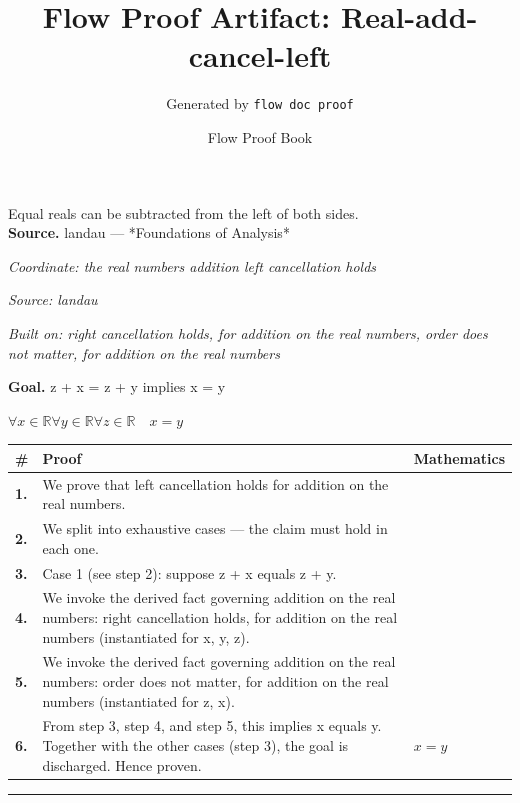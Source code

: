 \documentclass[11pt]{article}
\title{Flow Proof Artifact: Real-add-cancel-left}
\author{Generated by \texttt{flow doc proof}}
\date{Flow Proof Book}
\theoremstyle{definition}
\begin{document}
\maketitle
Equal reals can be subtracted from the left of both sides.\\[0.5em]
\textbf{Source.} landau — *Foundations of Analysis*\\[0.5em]
\bigskip
{}\par
\smallskip\noindent\textit{Coordinate: the real numbers \cdot addition \cdot left cancellation holds}\par
\smallskip\noindent\textit{Source: landau}\par
\smallskip\noindent\textit{Built on: right cancellation holds, for addition on the real numbers, order does not matter, for addition on the real numbers}\par
\medskip
\noindent\textbf{Goal.} z + x = z + y implies x = y\par
\noindent$\displaystyle \forall x \in \mathbb{R} \forall y \in \mathbb{R} \forall z \in \mathbb{R}\quad x = y$\par
\medskip
\noindent
\begin{tabular}{@{} >{\raggedright\arraybackslash}p{} >{\raggedright\arraybackslash}p{} >{\raggedleft\arraybackslash}p{} @{}}
\textbf{\#} & \textbf{Proof} & \textbf{Mathematics} \\
\midrule
\textbf{1.} & We prove that left cancellation holds for addition on the real numbers. & \\[0.45em]
\textbf{2.} & We split into exhaustive cases — the claim must hold in each one. & \\[0.45em]
\textbf{3.} & Case 1 (see step 2): suppose z + x  equals  z + y. & \\[0.45em]
\textbf{4.} & We invoke the derived fact governing addition on the real numbers: right cancellation holds, for addition on the real numbers (instantiated for x, y, z). & \\[0.45em]
\textbf{5.} & We invoke the derived fact governing addition on the real numbers: order does not matter, for addition on the real numbers (instantiated for z, x). & \\[0.45em]
\textbf{6.} & From step 3, step 4, and step 5, this implies x equals y. Together with the other cases (step 3), the goal is discharged. Hence proven. & $\displaystyle x = y$ \\[0.45em]
\bottomrule
\end{tabular}
\label{thm:Real-addition-left_cancellation_holds}
\par\medskip\hrule
\end{document}
